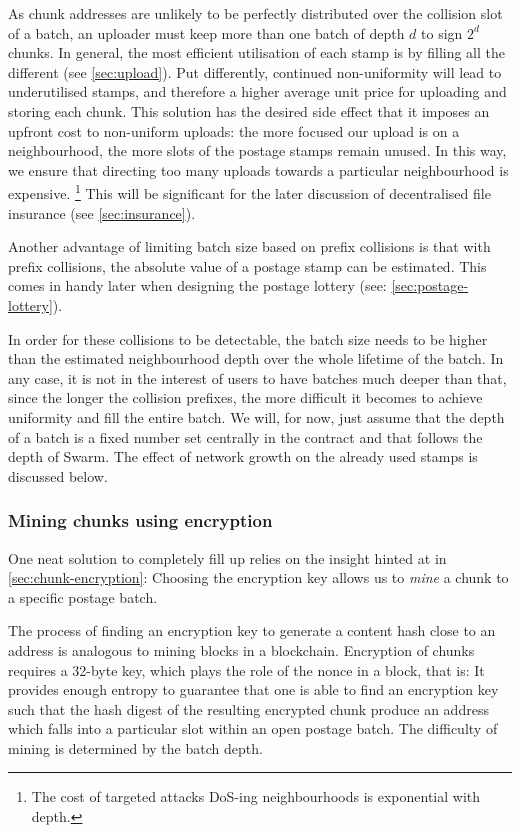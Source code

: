 As chunk addresses are unlikely to be perfectly distributed over the collision slot of a batch, an uploader must keep more than one batch of depth $d$ to sign $2^d$ chunks. In general, the most efficient utilisation of each stamp is by filling all the different  (see \ref{sec:upload}). Put differently, continued non-uniformity will lead to underutilised stamps, and therefore a higher average unit price for uploading and storing each chunk. This solution has the desired side effect that it imposes an upfront cost to non-uniform uploads: the more focused our upload is on a neighbourhood, the more slots of the postage stamps remain unused. In this way, we ensure that directing too many uploads towards a particular neighbourhood is expensive.%
%
\footnote{The cost of targeted attacks DoS-ing neighbourhoods is exponential with depth.}
%
This will be significant for the later discussion of decentralised file insurance (see \ref{sec:insurance}). 

Another advantage of limiting batch size based on prefix collisions is that with prefix collisions, the absolute value of a postage stamp can be estimated. This comes in handy later when designing the postage lottery (see: \ref{sec:postage-lottery}). 


In order for these collisions to be detectable, the batch size needs to be higher than the estimated neighbourhood depth over the whole lifetime of the batch. In any case, it is not in the interest of users to have batches much deeper than that, since the longer the collision prefixes, the more difficult it becomes to achieve uniformity and fill the entire batch. We will, for now, just assume that the depth of a batch is a fixed number set centrally in the contract and that follows the depth of Swarm. The effect of network growth on the already used stamps is discussed below.


\subsubsection{Mining chunks using encryption}

One neat solution to completely fill up  relies on the insight hinted at in \ref{sec:chunk-encryption}: Choosing the encryption key allows us to \emph{mine} a chunk to a specific postage batch.

The process of finding an encryption key to generate a content hash close to an address is analogous to mining blocks in a blockchain. Encryption of chunks requires a 32-byte key, which plays the role of the nonce in a block, that is: It provides enough entropy to guarantee that one is able to find an encryption key such that the hash digest of the resulting encrypted chunk produce an address which falls into a particular slot within an open postage batch. The difficulty of mining is determined by the batch depth. 

